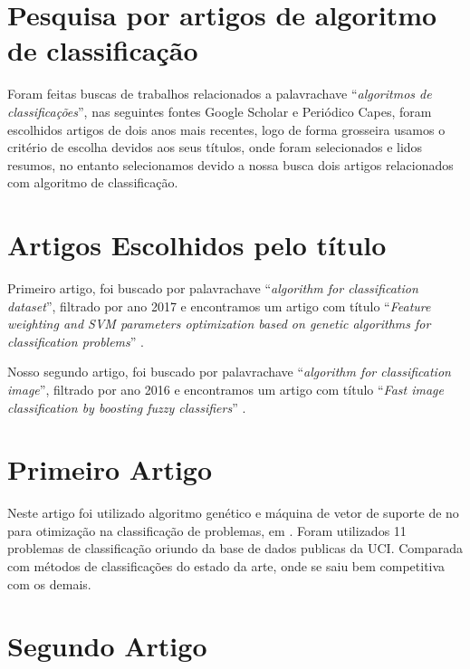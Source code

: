 \documentclass[12pt,a4paper,letterpaper]{article}
\newcommand\wb[1]{\discretionary{#1}{#1}{#1}}
\begin{document}
\section{Pesquisa por artigos de algoritmo de classificação}

Foram feitas buscas de trabalhos relacionados a palavra\wb-chave
``\textit{algoritmos de classificações}'', nas seguintes fontes Google Scholar e
Periódico Capes, foram escolhidos artigos de dois anos mais recentes, logo de
forma grosseira usamos o critério de escolha devidos aos seus títulos, onde
foram selecionados e lidos resumos, no entanto selecionamos devido a nossa busca
dois artigos relacionados com algoritmo de classificação.

\section{Artigos Escolhidos pelo título}

Primeiro artigo, foi buscado por palavra\wb-chave ``\textit{algorithm for
classification dataset}'', filtrado por ano 2017 e encontramos um artigo com
título ``\textit{Feature weighting and SVM parameters optimization based on
genetic algorithms for classification problems}'' \autocite{PHAN2017}.

Nosso segundo artigo, foi buscado por palavra\wb-chave ``\textit{algorithm for
classification image}'', filtrado por ano 2016 e encontramos um artigo com
título ``\textit{Fast image classification by boosting fuzzy classifiers}''
\autocite{KORYTKOWSKI2016}.

\section{Primeiro Artigo}
Neste artigo foi utilizado algoritmo genético e máquina de vetor de suporte de
no para otimização na classificação de problemas, em \autocite{PHAN2017}.
Foram utilizados 11 problemas de classificação oriundo da base de dados publicas
da UCI. Comparada com métodos de classificações do estado da arte, onde se saiu
bem competitiva com os demais.

\section{Segundo Artigo}
\autocite{KORYTKOWSKI2016}

\pagebreak
\medskip
\printbibliography[
    heading=bibintoc,
    title={Referências Bibliográficas}
]
\end{document}
